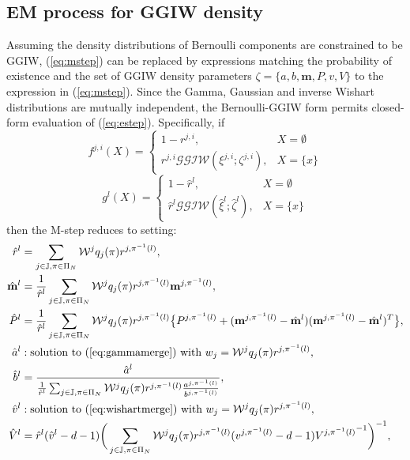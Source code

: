 \subsection{EM process for GGIW density}
Assuming the density distributions of Bernoulli components are constrained to be GGIW, (\ref{eq:mstep}) can be replaced by expressions matching the probability of existence and the set of GGIW density parameters $\zeta = \{a,b,\mathbf{m},P,v,V\}$ to the expression in (\ref{eq:mstep}). Since the Gamma, Gaussian and inverse Wishart distributions are mutually independent, the Bernoulli-GGIW form permits closed-form evaluation of (\ref{eq:estep}). Specifically, if
\begin{equation}
    f^{j,i}(X) = \begin{cases}
        1 - r^{j,i}, & X = \emptyset\\
        r^{j,i}\mathcal{GGIW}(\xi^{j,i};\zeta^{j,i}), & X = \{x\}
    \end{cases}
\end{equation}
\begin{equation}
    g^{l}(X) = \begin{cases}
        1 - \hat{r}^{l}, & X = \emptyset\\
        \hat{r}^{l}\mathcal{GGIW}(\hat{\xi}^{l};\hat{\zeta}^{l}), & X = \{x\}
    \end{cases}
\end{equation}
then the M-step reduces to setting:
\begin{subequations}
\begin{align}
    \hat{r}^{l} & = \sum_{j\in\mathbb{J},\pi\in\Pi_N}\mathcal{W}^jq_j(\pi)r^{j,\pi^{-1}(l)},\\
    \hat{\mathbf{m}}^{l} & = \frac{1}{\hat{r}^{l}}\sum_{j\in\mathbb{J},\pi\in\Pi_N}\mathcal{W}^jq_j(\pi)r^{j,\pi^{-1}(l)}\mathbf{m}^{j,\pi^{-1}(l)},\\
    \hat{P}^{l} & = \frac{1}{\hat{r}^{l}}\sum_{j\in\mathbb{J},\pi\in\Pi_N}\mathcal{W}^jq_j(\pi)r^{j,\pi^{-1}(l)}\big\{P^{j,\pi^{-1}(l)}+(\mathbf{m}^{j,\pi^{-1}(l)}-\hat{\mathbf{m}}^{l})(\mathbf{m}^{j,\pi^{-1}(l)}-\hat{\mathbf{m}}^{l})^T\big\},\\
    \hat{a}^l & : \text{solution to (\ref{eq:gammamerge}) with  } w_j=\mathcal{W}^jq_j(\pi)r^{j,\pi^{-1}(l)},\\
    \hat{b}^l & = \frac{\hat{a}^l}{\frac{1}{\hat{r}^{l}}\sum_{j\in\mathbb{J},\pi\in\Pi_N}\mathcal{W}^jq_j(\pi)r^{j,\pi^{-1}(l)}\frac{a^{j,\pi^{-1}(l)}}{b^{j,\pi^{-1}(l)}}},\\
    \hat{v}^l & : \text{solution to (\ref{eq:wishartmerge}) with  } w_j=\mathcal{W}^jq_j(\pi)r^{j,\pi^{-1}(l)},\\
    \hat{V}^l & = \hat{r}^{l}(\hat{v}^{l}-d-1)\bigg(\sum_{j\in\mathbb{J},\pi\in\Pi_N}\mathcal{W}^jq_j(\pi)r^{j,\pi^{-1}(l)}(v^{j,\pi^{-1}(l)}-d-1){V^{j,\pi^{-1}(l)}}^{-1}\bigg)^{-1},
\end{align}
\end{subequations}
